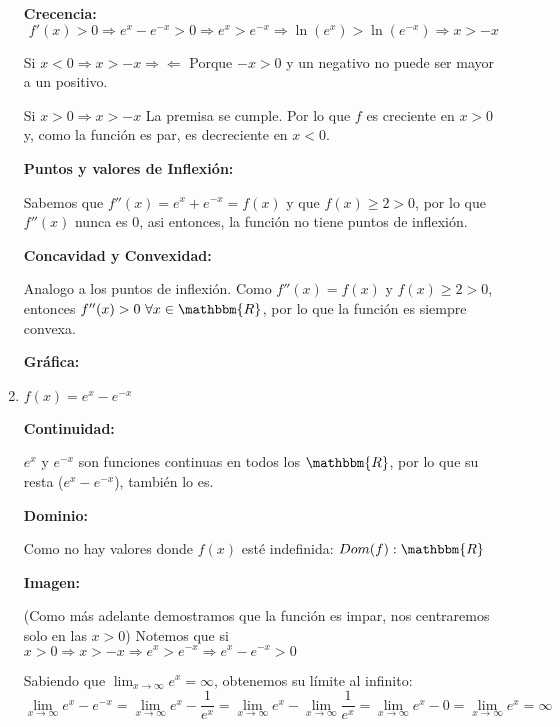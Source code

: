 \documentclass[12pt]{article}
\begin{document}
\begin{enumerate}[\hspace{9px} a)]
        \textbf{Crecencia: }
        \begin{equation*}
            f'(x)>0 \Rightarrow e^x-e^{-x}>0 \Rightarrow e^x>e^{-x} \Rightarrow \ln(e^x)>\ln(e^{-x}) \Rightarrow x>-x
        \end{equation*}

        Si \(x<0 \Rightarrow x>-x\Rightarrow\!\Leftarrow\) Porque \(-x>0\) y un negativo no puede ser mayor a un positivo.\medskip

        Si \(x>0 \Rightarrow x>-x\) La premisa se cumple. Por lo que \(f\) es creciente en \(x>0\) y, como la funci\'on es par, es decreciente en \(x<0\).\medskip

        \textbf{Puntos y valores de Inflexi\'on: }\medskip

            Sabemos que \(f''(x)=e^x+e^{-x}=f(x)\) y que \(f(x)\geq2>0\), por lo que \(f''(x)\) nunca es 0, asi entonces, la funci\'on no tiene puntos de inflexi\'on.\medskip

        \textbf{Concavidad y Convexidad: }

            Analogo a los puntos de inflexi\'on. Como \(f''(x)=f(x)\) y \(f(x)\geq2>0\), entonces \(f''(x)>0 \ \forall x\in\mathbbm{R}\), por lo que la funci\'on es siempre convexa.\medskip

        \textbf{Gr\'afica: }

    \item \(f(x)=e^x-e^{-x}\)\medskip
    
        \textbf{Continuidad: }\medskip

            \(e^x\) y \(e^{-x}\) son funciones continuas en todos los \(\mathbbm{R}\), por lo que su resta (\(e^x-e^{-x}\)), tambi\'en lo es.\medskip

        \textbf{Dominio: }\medskip

            Como no hay valores donde $f(x)$ est\'e indefinida: \(Dom(f):\mathbbm{R}\)\medskip

        \textbf{Imagen: }\medskip

            (Como m\'as adelante demostramos que la funci\'on es impar, nos centraremos solo en las \(x>0\)) Notemos que si \(x>0 \Rightarrow x>-x \Rightarrow e^x>e^{-x} \Rightarrow e^x-e^{-x}>0\)\medskip

            Sabiendo que \(\lim_{x\to\infty}e^x=\infty\), obtenemos su l\'imite al infinito:
            \begin{equation*}
                \lim_{x\to\infty}e^x-e^{-x}=\lim_{x\to\infty}e^x-\frac{1}{e^x}=\lim_{x\to\infty}e^x-\lim_{x\to\infty}\frac{1}{e^x} = \lim_{x\to\infty}e^x-0=\lim_{x\to\infty}e^x=\infty
            \end{equation*}


\end{enumerate}
\end{document}

